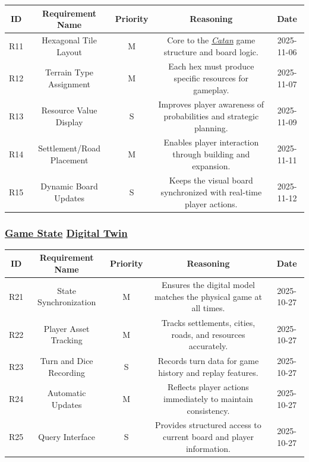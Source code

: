 \documentclass{article}
\newcommand{\Catan}{\href{https://en.wikipedia.org/wiki/Catan}{Catan}}
\newcommand{\DigitalTwin}{\href{https://en.wikipedia.org/wiki/Digital_twin}{Digital Twin}}
\newcommand{\GameState}{\href{https://milvus.io/ai-quick-reference/what-is-a-state-in-rl}{Game State}}
\begin{document}
\begin{tabular}{|c|c|c|c|c|}
\hline
\textbf{ID} & \textbf{Requirement Name} & \textbf{Priority} &
\textbf{Reasoning} & \textbf{Date} \\
\hline
R11 & Hexagonal Tile Layout & M &
\parbox[t]{4cm}{Core to the \emph{\Catan{}} game structure and board logic.} &
2025-11-06 \\
\hline
R12 & Terrain Type Assignment & M &
\parbox[t]{4cm}{Each hex must produce specific resources for gameplay.} &
2025-11-07 \\
\hline
R13 & Resource Value Display & S &
\parbox[t]{4cm}{Improves player awareness of probabilities and
strategic planning.} &
2025-11-09 \\
\hline
R14 & Settlement/Road Placement & M &
\parbox[t]{4cm}{Enables player interaction through building and
expansion.} &
2025-11-11 \\
\hline
R15 & Dynamic Board Updates & S &
\parbox[t]{4cm}{Keeps the visual board synchronized with real-time
player actions.} &
2025-11-12 \\
\hline
\end{tabular}

\vspace{1em}

\subsubsection*{\GameState{} \DigitalTwin{}}

\begin{tabular}{|c|c|c|c|c|}
\hline
\textbf{ID} & \textbf{Requirement Name} & \textbf{Priority} &
\textbf{Reasoning} & \textbf{Date} \\
\hline
R21 & State Synchronization & M &
\parbox[t]{4cm}{Ensures the digital model matches the physical game
at all times.} &
2025-10-27 \\
\hline
R22 & Player Asset Tracking & M &
\parbox[t]{4cm}{Tracks settlements, cities, roads, and resources
accurately.} &
2025-10-27 \\
\hline
R23 & Turn and Dice Recording & S &
\parbox[t]{4cm}{Records turn data for game history and replay
features.} &
2025-10-27 \\
\hline
R24 & Automatic Updates & M &
\parbox[t]{4cm}{Reflects player actions immediately to maintain
consistency.} &
2025-10-27 \\
\hline
R25 & Query Interface & S &
\parbox[t]{4cm}{Provides structured access to current board and
player information.} &
2025-10-27 \\
\hline
\end{tabular}
\end{document}
